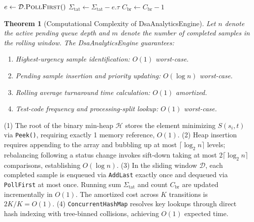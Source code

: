 \documentclass[conference]{IEEEtran}
\newtheorem{theorem}{Theorem}
\begin{document}
\begin{algorithm}[t]
\begin{algorithmic}[1]
        \STATE $e \leftarrow \mathcal{D}.\textsc{PollFirst}()$ 
        \STATE $\Sigma_{\text{tat}} \leftarrow \Sigma_{\text{tat}} - e.\tau$
            \STATE $C_{\text{br}} \leftarrow C_{\text{br}} - 1$
        \ENDIF
    \ENDWHILE
\endPROCEDURE
\end{algorithmic}
\end{algorithm}

\begin{theorem}[Computational Complexity of DsaAnalyticsEngine]
Let $n$ denote the active pending queue depth and $m$ denote the number of completed samples in the rolling window. The DsaAnalyticsEngine guarantees:
\begin{enumerate}
    \item Highest-urgency sample identification: $O(1)$ worst-case.
    \item Pending sample insertion and priority updating: $O(\log n)$ worst-case.
    \item Rolling average turnaround time calculation: $O(1)$ amortized.
    \item Test-code frequency and processing-split lookup: $O(1)$ worst-case.
\end{enumerate}
\end{theorem}

\begin{IEEEproof}
(1) The root of the binary min-heap $\mathcal{H}$ stores the element minimizing $S(s_i, t)$ via \texttt{Peek()}, requiring exactly 1 memory reference, $O(1)$.
(2) Heap insertion requires appending to the array and bubbling up at most $\lceil \log_2 n \rceil$ levels; rebalancing following a status change invokes sift-down taking at most $2 \lceil \log_2 n \rceil$ comparisons, establishing $O(\log n)$.
(3) In the sliding window $\mathcal{D}$, each completed sample is enqueued via \texttt{AddLast} exactly once and dequeued via \texttt{PollFirst} at most once. Running sum $\Sigma_{\text{tat}}$ and count $C_{\text{br}}$ are updated incrementally in $O(1)$. The amortized cost across $K$ transitions is $2K/K = O(1)$.
(4) \texttt{ConcurrentHashMap} resolves key lookups through direct hash indexing with tree-binned collisions, achieving $O(1)$ expected time.
\end{IEEEproof}

\end{document}
